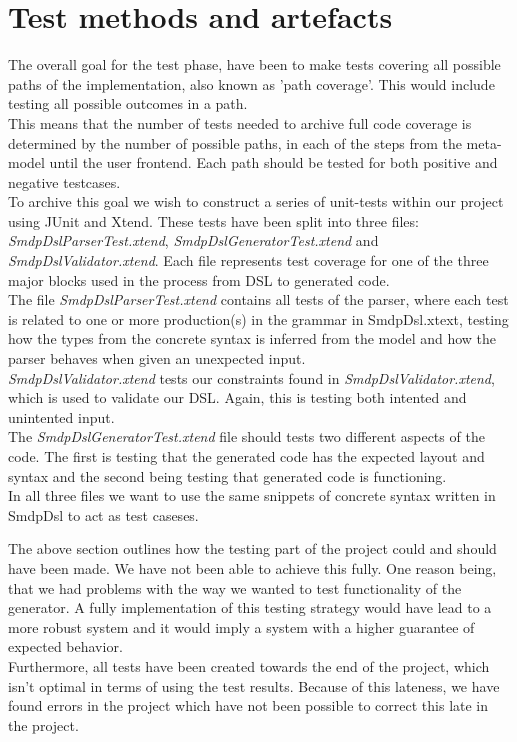 \documentclass[paper=a4, fontsize=11pt]{scrartcl} %
\numberwithin{equation}{section} %
\numberwithin{figure}{section} %
\numberwithin{table}{section} %
\begin{document}
\section{Test methods and artefacts}
The overall goal for the test phase, have been to make tests covering all possible paths of the implementation, also known as 'path coverage'. This would include testing all possible outcomes in a path.\\ 
This means that the number of tests needed to archive full code coverage is determined by the number of possible paths, in each of the steps from the meta-model until the user frontend. Each path should be tested for both positive and negative testcases.\\

To archive this goal we wish to construct a series of unit-tests within our project using JUnit and Xtend. These tests have been split into three files: \textit{SmdpDslParserTest.xtend}, \textit{SmdpDslGeneratorTest.xtend} and \textit{SmdpDslValidator.xtend}. Each file represents test coverage for one of the three major blocks used in the process from DSL to generated code.\\
The file \textit{SmdpDslParserTest.xtend} contains all tests of the parser, where each test is related to one or more production(s) in the grammar in SmdpDsl.xtext, testing how the types from the concrete syntax is inferred from the model and how the parser behaves when given an unexpected input.\\ 
\textit{SmdpDslValidator.xtend} tests our constraints found in \textit{SmdpDslValidator.xtend}, which is used to validate our DSL. Again, this is testing both intented and unintented input.\\ 
The \textit{SmdpDslGeneratorTest.xtend} file should tests two different aspects of the code. The first is testing that the generated code has the expected layout and syntax and the second being testing that generated code is functioning. \\
In all three files we want to use the same snippets of concrete syntax written in SmdpDsl to act as test caseses.\newline

The above section outlines how the testing part of the project could and should have been made. We have not been able to achieve this fully. One reason being, that we had problems with the way we wanted to test functionality of the generator. A fully implementation of this testing strategy would have lead to a more robust system and it would imply a system with a higher guarantee of expected behavior. \\
Furthermore, all tests have been created towards the end of the project, which isn't optimal in terms of using the test results. Because of this lateness, we have found errors in the project which have not been possible to correct this late in the project.\\
\end{document}
